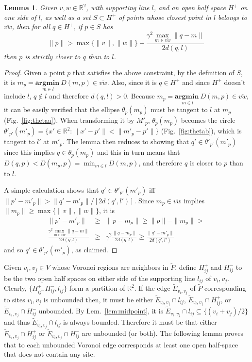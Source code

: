\documentclass[11pt]{article}
\newtheorem{lemma}[theorem]{Lemma}
\begin{document}
\begin{lemma}\label{lem:tech}
	Given $v,w\in\mathbb{R}^2$, with supporting line $l$, and 
an open half space $H^{+}$ on one side of $l$, 
as well as a set $S\subset H^{+}$ of points whose closest point in $l$
belongs to $\overline{v w}$, 
then 
for all $q\in H^{+}$, if $p\in S$ has
\[ \|p\| > \max\{\|v\|,\|w\|\} + \frac{\gamma^2 \displaystyle{\max_{m\in\overline{v w}} \|q-m\|} }{ 2 d(q,l) }\]
then $p$ is strictly closer to $q$ than to $l$. 
\end{lemma}
\begin{proof}
Given a point $p$ that satisfies the above constraint, 
by the definition of $S$, 
it is $m_p = \underset{m\in l}{\mathbf{argmin\ } } D(m,p)\in\overline{v w}$. 
Also, since it is $q\in H^{+}$ and since $H^{+}$ doesn't include $l$, 
$q\notin l$ and therefore $d(q,l) > 0$.
Because $m_p = \underset{m\in l}{\mathbf{argmin\ }} D(m,p)\in\overline{v w}$, 
it can be easily verified that the ellipse $\theta_p(m_p)$ must be 
tangent to $l$ at $m_p$ (Fig.~\ref{fig:thetaa}). 
When transforming it by $M'_p$, $\theta_p(m_p)$ becomes the circle
$\theta'_{p'}(m'_p)=\{x'\in\mathbb{R}^2 : \|x'-p'\| < \|m'_p-p'\|\}$
(Fig.~\ref{fig:thetab}), which is tangent to $l'$ at $m'_p$. 
The lemma then reduces to showing that $q'\in\theta'_{p'}(m'_p)$ since this
implies $q\in\theta_p(m_p)$ and this in turn means that $D(q,p) < D(m_p,p) = \min_{m\in l}
D(m,p)$, and therefore $q$ is closer to $p$ than to $l$. 




A simple calculation shows that $q'\in\theta'_{p'}(m'_p)$ iff 
$\|p'-m'_p\| > \|q'-m'_p\| / \left[2 d(q',l')\right]$. Since $m_p\in\overline{v w}$ implies $\|m_p\| \ge
\max\{\|v\|,\|w\|\}$, it is 
\begin{eqnarray*}
	\|p'-m'_p\| &\ge& \|p-m_p\| \ge \|p\| - \|m_p\| > \\
 \frac{\gamma^2 \displaystyle{\max_{m\in\overline{v w}} \|q-m\|} }{ 2 d(q,l) }
&\ge& \gamma^2 \frac{\|q-m_p\|}{ 2 d(q,l) } 
 \ge \frac{\|q'-m'_p\|}{2 d(q',l')}
\end{eqnarray*}
and so $q'\in\theta'_{p'}(m'_p)$, as claimed. 	
\end{proof}



Given $v_i,v_j\in V$ whose Voronoi regions are neighbors in $\tilde{P}$, define $H^{+}_{ij}$ and $H^{-}_{ij}$ to be the two open half spaces 
on either side of the supporting line
$l_{ij}$ of $v_i,v_j$. Clearly, $\{H^{+}_{ij}, H^{-}_{ij}, l_{ij}\}$ form a partition of
$\mathbb{R}^2$. 
If the edge $\tilde{E}_{v_i,v_j}$ of $\tilde{P}$ corresponding to sites $v_i,v_j$ is unbounded
then, it must be either $\tilde{E}_{v_i,v_j}\cap l_{ij}$, $\tilde{E}_{v_i,v_j}\cap H^{+}_{ij}$, or
$\tilde{E}_{v_i,v_j}\cap H^{-}_{ij}$ unbounded.
By Lem.~\ref{lem:midpoint}, it is $\tilde{E}_{v_i,v_j}\cap l_{ij}\subseteq \{(v_i+v_j)/2\}$ 
and thus $\tilde{E}_{v_i,v_j}\cap l_{ij}$ is always bounded. 
Therefore it must be that either $\tilde{E}_{v_i,v_j}\cap H^{+}_{ij}$ or
$\tilde{E}_{v_i,v_j}\cap H^{-}_{ij}$ are unbounded (or both). 
The following lemma proves that to each unbounded Voronoi edge corresponds
at least one open half-space that does not contain any site. 
\end{document}
